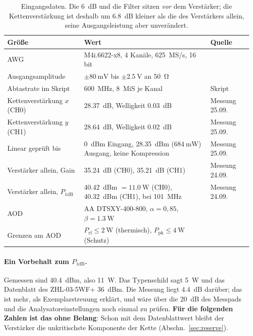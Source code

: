 \documentclass[11pt,a4paper]{article}
\newcommand{\Pone}{P_{\mathrm{1dB}}}
\newcommand{\Prf}{P_{\mathrm{rf}}}
\newcommand{\Ppk}{P_{\mathrm{pk}}}
\begin{document}
\begin{table}[htbp]
\centering\small
\begin{tabularx}{\textwidth}{@{}lXl@{}}
\toprule
Größe & Wert & Quelle\\
\midrule
AWG & M4i.6622-x8, 4 Kanäle, \SI{625}{MS/s}, 16 bit & \cite{spectrum}\\
Ausgangsamplitude & $\pm\SI{80}{\milli\volt}$ bis $\pm\SI{2,5}{\volt}$ an \SI{50}{\ohm} & \cite{spectrum}\\
Abtastrate im Skript & \SI{600}{\mega\hertz}, \SI{8}{MiS} je Kanal & Skript\\
\midrule
Kettenverstärkung $x$ (CH0) & \SI{+28,37}{\deci\bel}, Welligkeit \SI{0,03}{\deci\bel} & Messung 25.09.\\
Kettenverstärkung $y$ (CH1) & \SI{+28,64}{\deci\bel}, Welligkeit \SI{0,02}{\deci\bel} & Messung 25.09.\\
Linear geprüft bis & \SI{+0}{dBm} Eingang, \SI{+28,35}{dBm} ($\SI{684}{\milli\watt}$) Ausgang, keine Kompression & Messung 25.09.\\
Verstärker allein, Gain & \SI{+35,24}{\deci\bel} (CH0), \SI{+35,21}{\deci\bel} (CH1) & Messung 24.09.\\
Verstärker allein, $\Pone$ & \SI{+40,42}{dBm} $=\SI{11,0}{\watt}$ (CH0), \SI{+40,32}{dBm} (CH1), bei \SI{101}{\mega\hertz} & Messung 24.09.\\
\midrule
AOD & AA DTSXY-400-800, $\alpha=0{,}85$, $\beta=\SI{1,3}{\watt}$ & \cite{beugung}\\
Grenzen am AOD & $\Prf\le\SI{2}{\watt}$ (thermisch), $\Ppk\le\SI{4}{\watt}$ (Schutz) & \cite{beugung}\\
\bottomrule
\end{tabularx}
\caption{Eingangsdaten. Die \SI{6}{\deci\bel} und die Filter sitzen \emph{vor}
dem Verstärker; die Kettenverstärkung ist deshalb um \SI{6,8}{\deci\bel}
kleiner als die des Verstärkers allein, seine Ausgangsleistung aber
unverändert.}
\label{tab:kette}
\end{table}

\paragraph{Ein Vorbehalt zum $\Pone$.} Gemessen sind \SI{+40,4}{dBm}, also
\SI{11}{\watt}. Das Typenschild sagt \SI{5}{\watt} und das Datenblatt des
ZHL-03-5WF+ \SI{+36}{dBm}. Die Messung liegt \SI{4,4}{\deci\bel} darüber; das
ist mehr, als Exemplarstreuung erklärt, und wäre über die \SI{20}{\deci\bel}
des Messpads und die Analysator\-einstellungen noch einmal zu prüfen.
\textbf{Für die folgenden Zahlen ist das ohne Belang}: Schon mit dem
Datenblattwert bleibt der Verstärker die unkritischste Komponente der Kette
(Abschn.~\ref{sec:reserve}).
\end{document}

